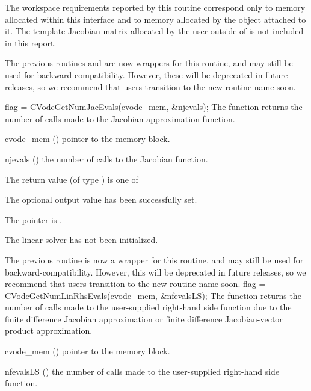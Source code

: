 {
  The workspace requirements reported by this routine correspond only
  to memory allocated within this interface and to memory allocated by
  the {\sunlinsol} object attached to it.  The template Jacobian
  matrix allocated by the user outside of {\cvls} is not included in
  this report.

  The previous routines  and
   are now wrappers for this routine, and may
  still be used for backward-compatibility.  However, these will be
  deprecated in future releases, so we recommend that users transition
  to the new routine name soon.
}
{
  flag = CVodeGetNumJacEvals(cvode\_mem, \&njevals);
}
{
  The function  returns the
  number of calls made to the {\cvls} Jacobian approximation
  function.
}
{
  \begin{args}
  \item[cvode\_mem] ()
    pointer to the {\cvodes} memory block.
  \item[njevals] ()
    the number of calls to the Jacobian function.
  \end{args}
}
{
  The return value  (of type ) is one of
  \begin{args}
  \item[\Id{CVLS\_SUCCESS}]
    The optional output value has been successfully set.
  \item[\Id{CVLS\_MEM\_NULL}]
    The  pointer is .
  \item[\Id{CVLS\_LMEM\_NULL}]
    The {\cvls} linear solver has not been initialized.
  \end{args}
}
{
  The previous routine  is now a wrapper for
  this routine, and may still be used for backward-compatibility.
  However, this will be deprecated in future releases, so we recommend
  that users transition to the new routine name soon.
}
{
  flag = CVodeGetNumLinRhsEvals(cvode\_mem, \&nfevalsLS);
}
{
  The function  returns the
  number of calls made to the user-supplied right-hand side function
  due to the finite difference Jacobian approximation or finite
  difference Jacobian-vector product approximation.
}
{
  \begin{args}
  \item[cvode\_mem] ()
    pointer to the {\cvodes} memory block.
  \item[nfevalsLS] ()
    the number of calls made to the user-supplied right-hand side function.
  \end{args}
}
